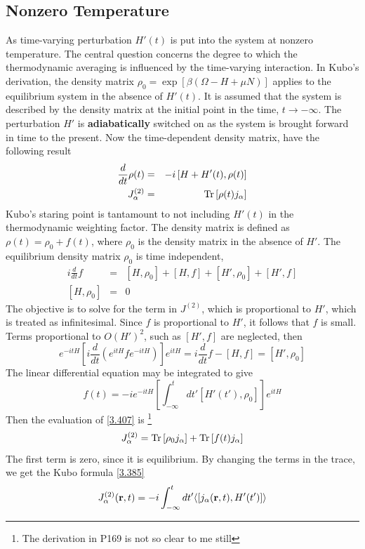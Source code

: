 \subsection{Nonzero Temperature}
As time-varying perturbation $H'(t)$ is put into the system at nonzero temperature.
The central question concerns the degree to which the thermodynamic averaging is influenced by the time-varying interaction.
In Kubo's derivation, the density matrix $\rho_0 = \exp\left[\beta (\Omega-H+\mu N)\right]$ applies to the equilibrium system in the absence of $H'(t)$.
It is assumed that the system is described by the density matrix at the initial point in the time, $t\to -\infty$.
The perturbation $H'$ is \textbf{adiabatically} switched on as the system is brought forward in time to the present.
Now the time-dependent density matrix, have the following result
\begin{eqnarray}
    \frac{d}{dt} \rho(t) &=& -i \left[H + H'(t), \rho(t) \right]    \label{3.406}   \\
    J^{(2)}_\alpha &=& \Tr\left[ \rho(t) j_\alpha \right]   \label{3.407}
\end{eqnarray}
Kubo's staring point is tantamount to not including $H'(t)$ in the thermodynamic weighting factor.
The density matrix is defined as $\rho(t) = \rho_0 + f(t) $, where $\rho_0$ is the density matrix in the absence of $H'$.
The equilibrium density matrix $\rho_0$ is time independent,
\begin{eqnarray}
    i \frac{d}{dt} f &=& \left[ H,\rho_0 \right] + \left[ H,f \right] + \left[ H',\rho_0 \right] + \left[ H', f \right] \label{3.408}   \\
    \left[ H, \rho_0 \right] &=& 0  \label{3.409}
\end{eqnarray}
The objective is to solve for the term in $J^{(2)}$, which is proportional to $H'$, which is treated as infinitesimal.
Since $f$ is proportional to $H'$, it follows that $f$ is small.
Terms proportional to $O(H')^2$, such as $\left[ H', f \right]$ are neglected, then
\begin{equation}
    e^{-itH} \left[ i \frac{d}{dt} (e^{itH} f e^{-itH}) \right] e^{itH} = i \frac{d}{dt} f - \left[ H, f\right] = \left[ H' , \rho_0 \right]    \label{3.412}
\end{equation}
The linear differential equation may be integrated to give
\begin{equation}
    f(t) = -i e^{-itH} \left[ \int_{-\infty}^t dt' \left[ H'(t'), \rho_0 \right] \right] e^{itH}    \label{3.414}
\end{equation}
Then the evaluation of \eqref{3.407} is \footnote{ The derivation in P169 is not so clear to me still}
\begin{equation}
    J^{(2)}_\alpha = \Tr \left[ \rho_0 j_\alpha \right] + \Tr \left[ f(t) j_\alpha \right] \label{3.415}
\end{equation}
The first term is zero, since it is equilibrium.
By changing the terms in the trace, we get the Kubo formula \eqref{3.385}
\begin{equation}
    J^{(2)}_\alpha (\mathbf{r},t) = -i \int_{-\infty}^t dt' \langle \left[j_\alpha(\mathbf{r},t),H'(t') \right] \rangle   \label{3.420}
\end{equation}
